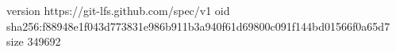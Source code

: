 version https://git-lfs.github.com/spec/v1
oid sha256:f88948e1f043d773831e986b911b3a940f61d69800c091f144bd01566f0a65d7
size 349692
